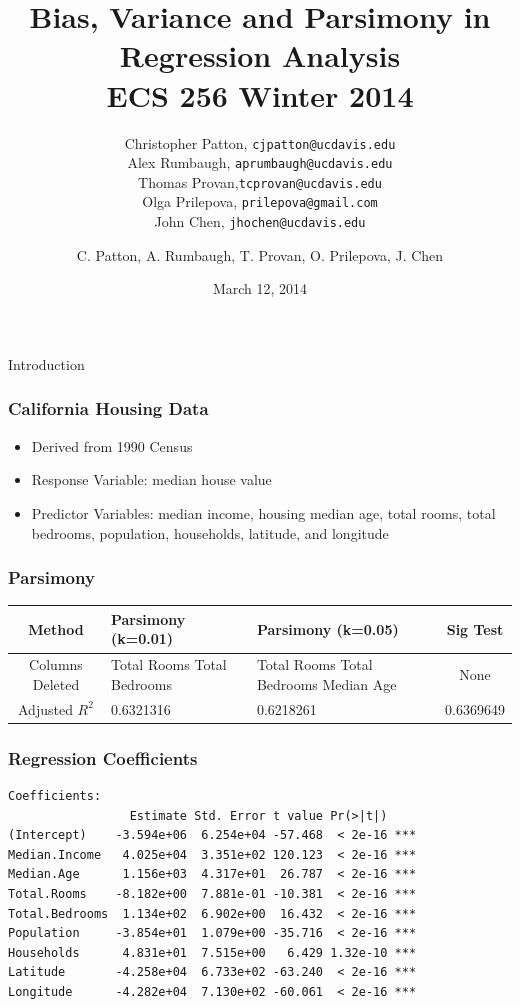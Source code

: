 \documentclass{beamer}
\title[Bias, Variance and Parsimony in Regression Analysis]{Bias, Variance and Parsimony in Regression Analysis\\ECS 256 Winter 2014}
\author[Prof. Norm Matloff Winter 2014]{
Christopher Patton, \texttt{cjpatton@ucdavis.edu}\\
Alex Rumbaugh, \texttt{aprumbaugh@ucdavis.edu}\\
Thomas Provan,\texttt{tcprovan@ucdavis.edu}\\
Olga Prilepova, \texttt{prilepova@gmail.com}\\
John Chen, \texttt{jhochen@ucdavis.edu}}
\institute{ECS 256, Winter 2014\\ \Large{UC Davis}}
\date{March 12, 2014}
\begin{document}
\begin{frame}
\titlepage
\end{frame}


\begin{frame}{Introduction}
\end{frame}

\author[Alex Rumbaugh]{C. Patton, A. Rumbaugh, T. Provan, O. Prilepova, J. Chen}
\begin{frame}
    \frametitle{California Housing Data}
	\begin{itemize}
		\item {Derived from 1990 Census}
		\item {Response Variable: median house value}
		\item {Predictor Variables: median income, housing median age, total rooms, total bedrooms, population, households, latitude, and longitude}
	\end{itemize}
\end{frame}

\begin{frame}
    \frametitle{Parsimony}
	\begin{tabular}{ | c | p{2.7cm} | p{2.7cm} | c  |} 
\hline
Method&Parsimony (k=0.01) & Parsimony (k=0.05) & Sig Test \\
\hline
Columns  Deleted& Total Rooms \newline Total Bedrooms & Total Rooms \newline Total Bedrooms \newline Median Age & None \\
\hline
Adjusted $R^2$ & 0.6321316 & 0.6218261 & 0.6369649 \\
\hline
\end{tabular}
\end{frame}

\begin{frame}[fragile]
    \frametitle{Regression Coefficients}
\begin{verbatim}
Coefficients:
                 Estimate Std. Error t value Pr(>|t|)    
(Intercept)    -3.594e+06  6.254e+04 -57.468  < 2e-16 ***
Median.Income   4.025e+04  3.351e+02 120.123  < 2e-16 ***
Median.Age      1.156e+03  4.317e+01  26.787  < 2e-16 ***
Total.Rooms    -8.182e+00  7.881e-01 -10.381  < 2e-16 ***
Total.Bedrooms  1.134e+02  6.902e+00  16.432  < 2e-16 ***
Population     -3.854e+01  1.079e+00 -35.716  < 2e-16 ***
Households      4.831e+01  7.515e+00   6.429 1.32e-10 ***
Latitude       -4.258e+04  6.733e+02 -63.240  < 2e-16 ***
Longitude      -4.282e+04  7.130e+02 -60.061  < 2e-16 ***
\end{verbatim}
\end{frame}
\end{document}
